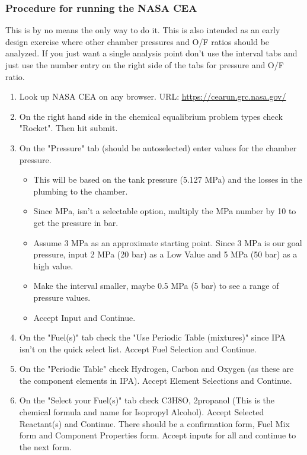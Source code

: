 \documentclass[12pt, letter paper]{article}
\begin{document}
			\subsubsection{Procedure for running the NASA CEA}
				This is by no means the only way to do it. This is also intended as an early design exercise where other chamber pressures and O/F ratios should be analyzed. 
				If you just want a single analysis point don't use the interval tabs and just use the number entry on the right side of the tabs for pressure and O/F ratio.
				\begin{enumerate}
					\item Look up NASA CEA on any browser. URL: \href{https://cearun.grc.nasa.gov/}{\underline{https://cearun.grc.nasa.gov/}}
					\item On the right hand side in the chemical equalibrium problem types check "Rocket". Then hit submit.
					\item On the "Pressure" tab (should be autoselected) enter values for the chamber pressure. 
						\begin{itemize}
							\item This will be based on the tank pressure (5.127 MPa) and the losses in the plumbing to the chamber. 
							\item Since MPa, isn't a selectable option, multiply the MPa number by 10 to get the pressure in bar.
							\item Assume 3 MPa as an approximate starting point. Since 3 MPa is our goal pressure, input 2 MPa (20 bar) as a Low Value and 5 MPa (50 bar) as a high value. 
							\item Make the interval smaller, maybe 0.5 MPa (5 bar) to see a range of pressure values. 
							\item Accept Input and Continue.
						\end{itemize}
					\item On the "Fuel(s)" tab check the "Use Periodic Table (mixtures)" since IPA isn't on the quick select list. Accept Fuel Selection and Continue.
					\item On the "Periodic Table" check Hydrogen, Carbon and Oxygen (as these are the component elements in IPA). Accept Element Selections and Continue.
					\item On the "Select your Fuel(s)" tab check C3H8O, 2propanol (This is the chemical formula and name for Isopropyl Alcohol). Accept Selected Reactant(s) and Continue. 
						There should be a confirmation form, Fuel Mix form and Component Properties form. Accept inputs for all and continue to the next form.

\end{enumerate}
\end{document}
